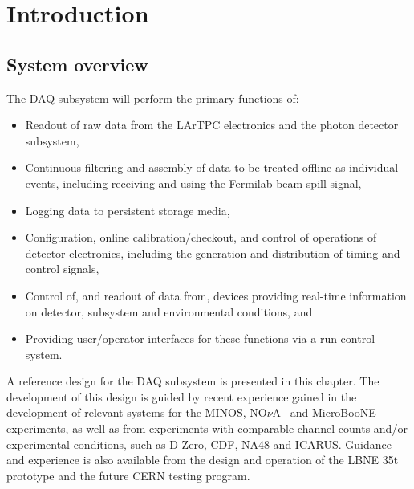 \section{Introduction}
\label{sec:daq_intro}

\subsection{System overview} 

The DAQ subsystem will perform the primary functions of:

\begin{itemize}
  \item Readout of raw data from the LArTPC electronics and the photon
    detector subsystem,

  \item Continuous filtering and assembly of data to be treated
    offline as individual events, including receiving and using the
    Fermilab beam-spill signal, 

  \item Logging data to persistent storage media,

  \item Configuration, online calibration/checkout, and control of 
        operations of detector electronics, including the generation 
        and distribution of timing and control signals,

  \item Control of, and readout of data from, devices 
        providing real-time information on detector, subsystem 
        and environmental conditions, and  

  \item Providing user/operator interfaces for these functions via 
        a run control system.
\end{itemize}

A reference design for the DAQ subsystem is presented in this chapter.
The development of this design is guided by recent experience gained
in the development of relevant systems for the MINOS,
NO$\nu$A~\cite{novatdr} and MicroBooNE~\cite{microboonecdr}
experiments, as well as from experiments with comparable channel
counts and/or experimental conditions, such as D-Zero, CDF, NA48 and
ICARUS.  Guidance and experience is also available from the design and
operation of the LBNE 35t prototype  and the future CERN testing
program.

